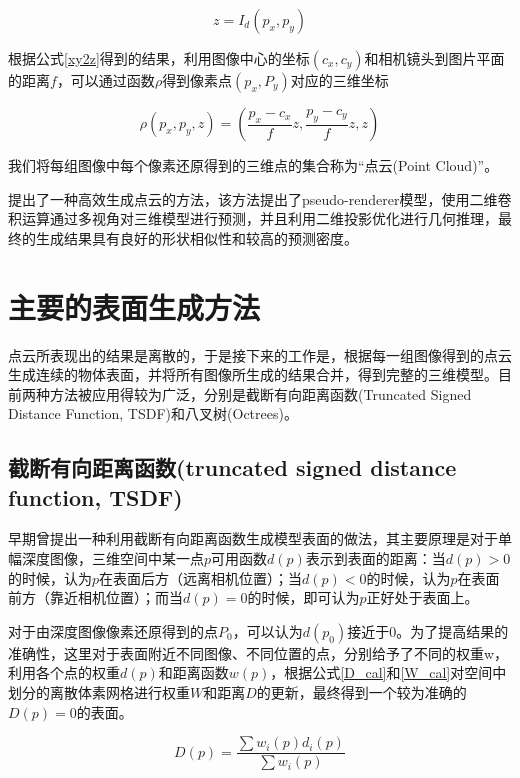 \documentclass{llncs}
\begin{document}
\begin{CJK}{UTF8}{song}
\begin{equation}
\label{xy2z}
	z = I_d(p_x,p_y)
\end{equation}

根据公式\ref{xy2z}得到的结果，利用图像中心的坐标$(c_x,c_y)$和相机镜头到图片平面的距离$f$，可以通过函数$\rho$得到像素点$(p_x,P_y)$对应的三维坐标

\begin{equation}
\label{get3dpoint}
	\rho(p_x,p_y,z) = (\frac{p_x-c_x}{f}z,\frac{p_y-c_y}{f}z,z)
\end{equation}

我们将每组图像中每个像素还原得到的三维点的集合称为“点云(Point Cloud)”。

\cite{DBLP:conf/aaai/LinKL18}提出了一种高效生成点云的方法，该方法提出了pseudo-renderer模型，使用二维卷积运算通过多视角对三维模型进行预测，并且利用二维投影优化进行几何推理，最终的生成结果具有良好的形状相似性和较高的预测密度。


\section{主要的表面生成方法}

点云所表现出的结果是离散的，于是接下来的工作是，根据每一组图像得到的点云生成连续的物体表面，并将所有图像所生成的结果合并，得到完整的三维模型。目前两种方法被应用得较为广泛，分别是截断有向距离函数(Truncated Signed Distance Function, TSDF)和八叉树(Octrees)。

	\subsection{截断有向距离函数(truncated signed distance function, TSDF)}

早期曾提出一种利用截断有向距离函数生成模型表面的做法\cite{DBLP:conf/siggraph/CurlessL96}，其主要原理是对于单幅深度图像，三维空间中某一点$p$可用函数$d(p)$表示到表面的距离：当$d(p)>0$的时候，认为$p$在表面后方（远离相机位置）；当$d(p)<0$的时候，认为$p$在表面前方（靠近相机位置）；而当$d(p)=0$的时候，即可认为$p$正好处于表面上。

对于由深度图像像素还原得到的点$P_0$，可以认为$d(p_0)$接近于0。为了提高结果的准确性，这里对于表面附近不同图像、不同位置的点，分别给予了不同的权重w，利用各个点的权重$d(p)$和距离函数$w(p)$，根据公式\ref{D_cal}和\ref{W_cal}对空间中划分的离散体素网格进行权重$W$和距离$D$的更新，最终得到一个较为准确的$D(p)=0$的表面。

\begin{equation}
\label{D_cal}
	D(p) = \frac{\sum w_i(p)d_i(p)}{\sum w_i(p)}
\end{equation}


\end{CJK}
\end{document}
